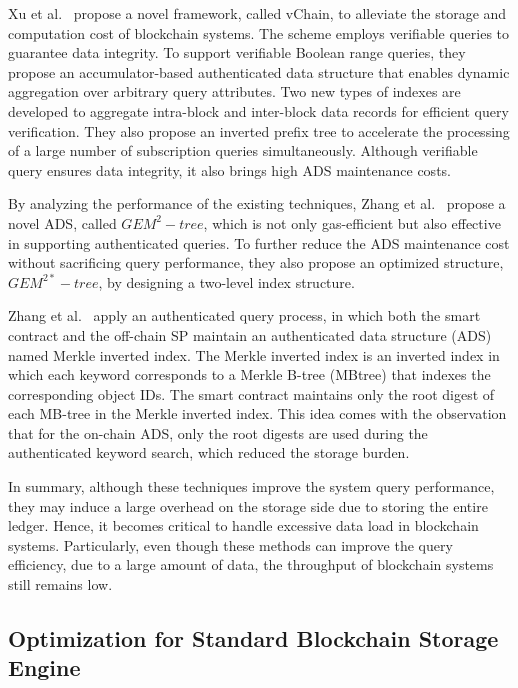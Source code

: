 \documentclass[acmsmall]{acmart}
\begin{document}
Xu et al.~\cite{xu2019vchain} propose a novel framework, called vChain, to alleviate the storage and computation cost of blockchain systems. The scheme employs verifiable queries to guarantee data integrity. To support verifiable Boolean range queries, they propose an accumulator-based authenticated data structure that enables dynamic aggregation over arbitrary query attributes. Two new types of indexes are developed to aggregate intra-block and inter-block data records for efficient query verification. They also propose an inverted prefix tree to accelerate the processing of a large number of subscription queries simultaneously. 
Although verifiable query ensures data integrity, it also brings high ADS maintenance costs.



By analyzing the performance of the existing techniques, Zhang et al.~\cite{zhang2019gem} propose a novel ADS, called $GEM^{2}-tree$, which is not only gas-efficient but also effective in supporting authenticated queries. To further reduce the ADS maintenance cost without sacrificing query performance, they also propose an optimized structure, $GEM^{2*}-tree$, by designing a two-level index structure.


Zhang et al.~\cite{DBLP:conf/icde/ZhangXWXC21} apply an authenticated query process, in which both the smart contract and the off-chain SP maintain an authenticated data structure (ADS) named Merkle inverted index. The Merkle inverted index is an inverted index in which each keyword corresponds to a Merkle B-tree (MBtree) that indexes the corresponding object IDs. The smart contract maintains only the root digest of each MB-tree in the Merkle inverted index. This idea comes with the observation that for the on-chain ADS, only the root digests are used during the authenticated keyword search, which reduced the storage burden.


In summary, although these techniques improve the system query performance, they may induce a large overhead on the storage side due to storing the entire ledger. Hence, it becomes critical to handle excessive data load in blockchain systems. Particularly, even though these methods can improve the query efficiency, due to a large amount of data, the throughput of blockchain systems still remains low.

\subsection{Optimization for Standard Blockchain Storage Engine}
\end{document}
